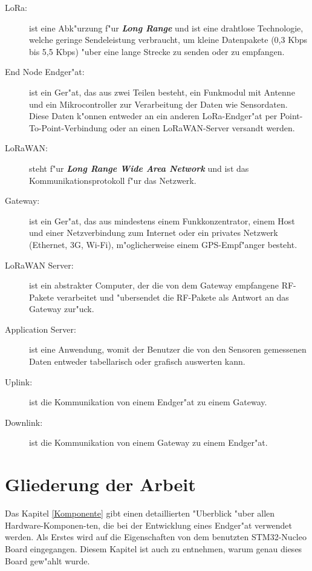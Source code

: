 \begin{description}
	\newpage
	\item[LoRa:] ist eine Abk"urzung f"ur 
	\textbf{\textit{Long Range}} 
	und ist eine drahtlose Technologie, welche geringe 
	Sendeleistung 
	verbraucht, um kleine Datenpakete (0,3 \ac{Kbps} 
	bis 5,5 Kbps) "uber 
	eine lange Strecke zu senden oder zu empfangen.    
	
	\item[End Node Endger"at:] ist ein Ger"at, das aus 
	zwei Teilen 
	besteht, ein Funkmodul mit Antenne und ein 
	Mikrocontroller zur 
	Verarbeitung der Daten wie Sensordaten. Diese Daten 
	k"onnen entweder 
	an ein anderen LoRa-Endger"at per 
	Point-To-Point-Verbindung oder an 
	einen LoRaWAN-Server versandt werden.

	\item[LoRaWAN:] steht f"ur \textbf{\textit{Long 
	Range Wide Area 
	Network}} und ist das Kommunikationsprotokoll f"ur 
	das Netzwerk.
	
	\item[Gateway:] ist ein Ger"at, das aus mindestens 
	einem 
	Funkkonzentrator, einem Host und einer 
	Netzverbindung zum Internet 
	oder ein privates Netzwerk (Ethernet, 3G, Wi-Fi), 
	m"oglicherweise 
	einem \ac{GPS}-Empf"anger besteht.
	
	\item[LoRaWAN Server:] ist ein abstrakter Computer, 
	der die von dem 
	Gateway empfangene RF-Pakete verarbeitet und "ubersendet die 
	RF-Pakete als Antwort an das Gateway zur"uck.
	\vspace{1cm}
	\item[Application Server:] ist eine Anwendung, 
	womit der Benutzer 
	die von den Sensoren gemessenen Daten entweder 
    tabellarisch oder 
	grafisch auswerten kann.
	
	\item[Uplink:] ist die Kommunikation von einem 
	Endger"at zu einem 
	Gateway. 
	
	\item[Downlink:] ist die Kommunikation von einem 
	Gateway zu einem 
	Endger"at.
\end{description}


\section{Gliederung der Arbeit}

Das Kapitel \ref{Komponente} gibt einen detaillierten 
"Uberblick "uber allen Hardware-Komponen-ten, die bei 
der Entwicklung eines Endger"at verwendet werden. Als 
Erstes wird auf die Eigenschaften von dem benutzten 
STM32-Nucleo Board eingegangen. Diesem Kapitel ist auch 
zu entnehmen, warum genau dieses Board gew"ahlt wurde. 


